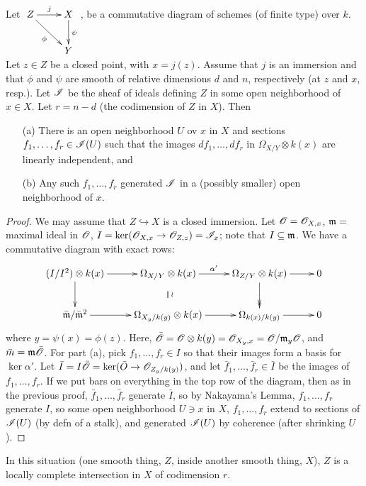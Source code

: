  \begin{lemma}\label{lec28lem1} Let $\xymatrix{Z\ar[r]^j \ar[dr]_{\phi} &
 X\ar[d]^{\psi}\\ & Y}$, be a commutative diagram of schemes (of finite type) over $k$.
 Let $z\in Z$ be a closed point, with $x=j(z)$.  Assume that $j$ is an immersion and
 that $\phi$ and $\psi$ are smooth of relative dimensions $d$ and $n$, respectively
 (at $z$ and $x$, resp.).  Let $\mathscr{I}$ be the sheaf of ideals defining $Z$ in some open
 neighborhood of $x\in X$. Let $r=n-d$ (the codimension of $Z$ in $X$).  Then
 \begin{itemize}
 \item[(a)] There is an open neighborhood $U$ ov $x$ in $X$ and sections $f_1,\dots,
 f_r\in \mathscr{I}(U)$ such that the images $df_1,\dots, df_r$ in $\Omega_{X/Y}\otimes k(x)$
 are linearly independent, and
 \item[(b)] Any such $f_1,\dots, f_r$ generated $\mathscr{I}$ in a (possibly smaller) open
 neighborhood of $x$.
 \end{itemize}
 \end{lemma}
 \begin{proof}
 We may assume that $Z\hookrightarrow X$ is a closed immersion.  Let $\mathscr{O}=\mathscr{O}_{X,x}$,
 $\mathfrak{m} =$ maximal ideal in $\mathscr{O}$, $I=\ker (\mathscr{O}_{X,x}\to \mathscr{O}_{Z,z})=\mathscr{I}_x$; note that
 $I\subseteq \mathfrak{m}$.  We have a commutative diagram with exact rows:
 \[\xymatrix{
   (I/I^2)\otimes k(x)\ar[d] \ar[r] & \Omega_{X/Y}\otimes k(x)
   \ar@{}[d]|{\parallel}^{\wr}
   \ar[r]^{\alpha'} & \Omega_{Z/Y}\otimes k(x) \ar@{->>}[d] \ar[r] & 0\\
    \bar\m/\bar\m^2\ar[r] & \Omega_{X_y/k(y)}\otimes k(x) \ar[r] & \Omega_{k(x)/k(y)} \ar[r] & 0\\
 }\]
 where $y=\psi(x)=\phi(z)$.  Here, $\bar {\mathscr{O}} = \mathscr{O}\otimes k(y) = \mathscr{O}_{X_y,x} = \mathscr{O}/\mathfrak{m}_y
 \mathscr{O}$, and $\bar m = \mathfrak{m}\bar{\mathscr{O}}$.  For part (a), pick $f_1,\dots, f_r\in I$ so that
 their images form a basis for $\ker \alpha'$.  Let $\bar I = I\bar {\mathscr{O}} = \ker(\bar O \to
 \mathscr{O}_{Z_y/k(y)})$, and let $\bar f_1,\dots, \bar f_r\in \bar I$ be the images of
 $f_1,\dots,f_r$.  If we put bars on everything in the top row of the diagram, then
 as in the previous proof, $\bar f_1,\dots,\bar f_r$ generate $\bar I$, so by
 Nakayama's Lemma, $f_1,\dots,f_r$ generate $I$, so some open neighborhood $U\ni x$
 in $X$, $f_1,\dots, f_r$ extend to sections of $\mathscr{I}(U)$ (by defn of a stalk), and
 generated $\mathscr{I}(U)$ by coherence (after shrinking $U$).
 \end{proof}

 \begin{corollary}
 In this situation (one smooth thing, $Z$, inside another smooth thing, $X$), $Z$ is
 a locally complete intersection in $X$ of codimension $r$.
 \end{corollary}


